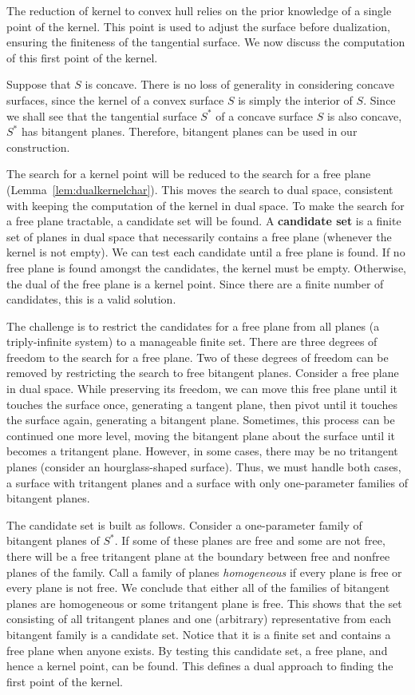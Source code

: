 \documentclass{elsart}
\begin{document}
The reduction of kernel to convex hull relies on the prior knowledge
of a single point of the kernel.
This point is used to adjust the surface before dualization, ensuring
the finiteness of the tangential surface.
We now discuss the computation of this first point of the kernel.

Suppose that $S$ is concave.
There is no loss of generality in considering concave surfaces,
since the kernel of a convex surface $S$ is simply the interior of $S$.
Since we shall see that the tangential surface $S^*$ of
a concave surface $S$ is also concave, $S^*$ has bitangent planes.
Therefore, bitangent planes can be used in our construction. %

The search for a kernel point will be reduced to the search for a free plane
(Lemma~\ref{lem:dualkernelchar}).
This moves the search to dual space, consistent with keeping the computation
of the kernel in dual space.
To make the search for a free plane tractable, a candidate set will be found.
A {\bf candidate set} is a finite set of planes in dual space
that necessarily contains a free plane (whenever the kernel is not empty).
We can test each candidate until a free plane is found.
If no free plane is found amongst the candidates,
the kernel must be empty.
Otherwise, the dual of the free plane is a kernel point.
Since there are a finite number of candidates, this is a valid solution.

The challenge is to restrict the candidates for a free plane from
all planes (a triply-infinite system) to a manageable finite set.
There are three degrees of freedom to the search for a free plane.
Two of these degrees of freedom can be removed by restricting the search
to free bitangent planes.
Consider a free plane in dual space.
While preserving its freedom, we can move this free plane
until it touches the surface once, generating a tangent plane,
then pivot until it touches the surface again, generating a bitangent plane.
Sometimes, this process can be continued one more level,
moving the bitangent plane about the surface until it becomes a
tritangent plane.
However, in some cases, there may be no tritangent planes
(consider an hourglass-shaped surface).
Thus, we must handle both cases, a surface with tritangent planes
and a surface with only one-parameter families of bitangent planes.

The candidate set is built as follows.
Consider a one-parameter family of bitangent planes of $S^*$.
If some of these planes are free and some are not free,
there will be a free tritangent plane at the boundary
between free and nonfree planes of the family.
Call a family of planes {\em homogeneous} if every plane is
free or every plane is not free.
We conclude that either all of the families of bitangent planes
are homogeneous or some tritangent plane is free.
This shows that the set consisting of all tritangent planes
and one (arbitrary) representative from each bitangent family
is a candidate set.
Notice that it is a finite set and contains a free plane when anyone exists.
By testing this candidate set, a free plane, and hence a kernel point, can be found.
This defines a dual approach to finding the first point of the kernel.
\end{document}
